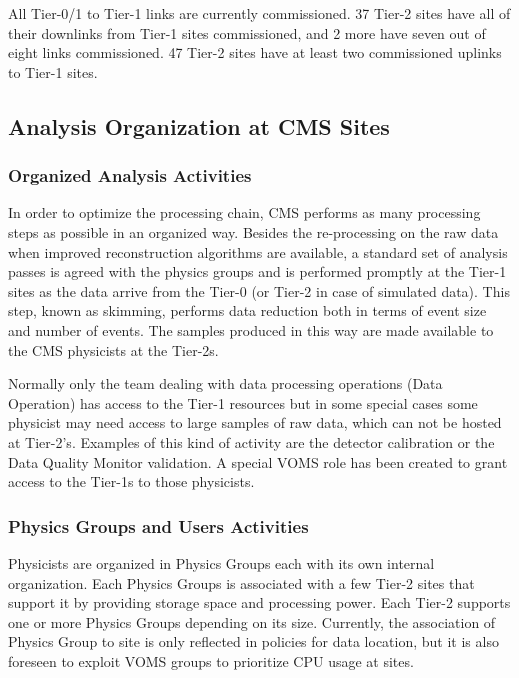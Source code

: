All Tier-0/1 to Tier-1 links are currently commissioned. 37 Tier-2 sites have
all of their downlinks from Tier-1 sites commissioned, and 2 more have seven out
of eight links commissioned. 47 Tier-2 sites have at least two commissioned
uplinks to Tier-1 sites.

\subsection{Analysis Organization at CMS Sites}
\label{sec:4_3}
\subsubsection{ Organized Analysis Activities }
\label{sec:4_3_1}
In order to optimize the processing chain, CMS performs as many processing
steps as possible in an organized way. 
Besides the re-processing %
on the raw data when improved reconstruction algorithms are available,
a standard set of analysis passes is agreed with the physics groups
and is performed promptly at the Tier-1 sites 
as the data arrive from the Tier-0 (or Tier-2 in case of simulated data). 
This step, known as skimming, performs data reduction both
in terms of event size and number of events. 
The samples produced in this way are made available
to the CMS physicists at the Tier-2s. %

Normally only the team dealing with data processing operations (Data Operation)
has access to the Tier-1 resources but in some special cases
some physicist may need access to large samples of raw data,
which can not be hosted at Tier-2's.
Examples of this kind of activity are the detector 
calibration or the Data Quality Monitor validation.
A special VOMS role has been created to grant access
to the Tier-1s to those physicists. 

\subsubsection{Physics Groups and Users Activities}
\label{sec:4_3_2}
Physicists are organized in Physics Groups each with its own internal 
organization.
Each Physics Groups is associated with a few Tier-2 sites that support it by 
providing storage space and processing power.
Each Tier-2 supports one or more Physics Groups depending on its size.
Currently, the association of Physics Group to site is only reflected in policies for data location, but it is also foreseen to exploit VOMS groups to prioritize CPU usage at sites.

